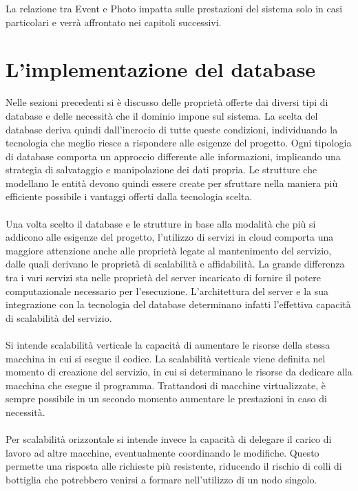 La relazione tra Event e Photo impatta sulle prestazioni del sistema solo in casi particolari e
verrà affrontato nei capitoli successivi.
\clearpage



\section{L'implementazione del database}
Nelle sezioni precedenti si è discusso delle proprietà
offerte dai diversi tipi di database e 
delle necessità che il dominio impone sul sistema.
La scelta del database deriva quindi dall'incrocio di tutte queste condizioni,
individuando la tecnologia che meglio riesce a rispondere alle esigenze del progetto. 
Ogni tipologia di database comporta un approccio differente alle informazioni,
implicando una strategia di salvataggio e manipolazione dei dati propria.
Le strutture che modellano le entità devono quindi
essere create per sfruttare nella maniera più efficiente possibile
i vantaggi offerti dalla tecnologia scelta.\\
\\
Una volta scelto il database e le strutture in base alla modalità 
che più si addicono alle esigenze del progetto,
l'utilizzo di servizi in cloud comporta una maggiore attenzione anche 
alle proprietà legate al mantenimento del servizio,
dalle quali derivano le proprietà di scalabilità e affidabilità.
La grande differenza tra i vari servizi sta nelle proprietà del server 
incaricato di fornire il potere computazionale necessario per l’esecuzione. 
L’architettura del server e la sua integrazione con la tecnologia del database
determinano infatti l’effettiva capacità di scalabilità del servizio.\\
\\
Si intende scalabilità verticale la capacità di aumentare le risorse 
della stessa macchina in cui si esegue il codice. 
La scalabilità verticale viene definita nel momento di creazione del servizio, 
in cui si determinano le risorse da dedicare alla macchina che esegue il programma. 
Trattandosi di macchine virtualizzate, 
è sempre possibile in un secondo momento aumentare le prestazioni in caso di necessità.\\
\\
Per scalabilità orizzontale si intende invece la capacità di 
delegare il carico di lavoro ad altre macchine, eventualmente coordinando le modifiche. 
Questo permette una risposta alle richieste più resistente, 
riducendo il rischio di colli di bottiglia che potrebbero venirsi a formare nell’utilizzo di un nodo singolo.
